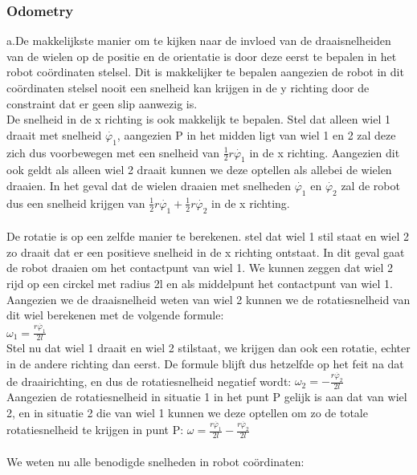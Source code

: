 \documentclass[a4paper]{article}
\begin{document}
\subsubsection{Odometry}
a.De makkelijkste manier om te kijken naar de invloed van de draaisnelheiden van de wielen op de positie en de orientatie is door deze eerst te bepalen in het robot co\"ordinaten stelsel. Dit is makkelijker te bepalen aangezien de robot in dit co\"ordinaten stelsel nooit een snelheid kan krijgen in de y richting door de constraint dat er geen slip aanwezig is.\\
De snelheid in de x richting is ook makkelijk te bepalen. Stel dat alleen wiel 1 draait met snelheid $\dot{\varphi_{1}}$, aangezien P in het midden ligt van wiel 1 en 2 zal deze zich dus voorbewegen met een snelheid van $\frac{1}{2}r\dot{\varphi_{1}}$ in de x richting. Aangezien dit ook geldt als alleen wiel 2 draait kunnen we deze optellen als allebei de wielen draaien.
In het geval dat de wielen draaien met snelheden $\dot{\varphi_{1}}$ en $\dot{\varphi_{2}}$ zal de robot dus een snelheid krijgen van $\frac{1}{2}r\dot{\varphi_{1}} + \frac{1}{2}r\dot{\varphi_{2}}$ in de x richting.\\\\
De rotatie is op een zelfde manier te berekenen. stel dat wiel 1 stil staat en wiel 2 zo draait dat er een positieve snelheid in de x richting ontstaat. In dit geval gaat de robot draaien om het contactpunt van wiel 1. We kunnen zeggen dat wiel 2 rijd op een circkel met radius 2l en als middelpunt het contactpunt van wiel 1. Aangezien we de draaisnelheid weten van wiel 2 kunnen we de rotatiesnelheid van dit wiel berekenen met de volgende formule:\\
$\omega_{1}=\frac{r\dot{\varphi_{1}}}{2l}$\\
Stel nu dat wiel 1 draait en wiel 2 stilstaat, we krijgen dan ook een rotatie, echter in de andere richting dan eerst.
De formule blijft dus hetzelfde op het feit na dat de draairichting, en dus de rotatiesnelheid negatief wordt:
$\omega_{2}=-\frac{r\dot{\varphi_{2}}}{2l}$\\
Aangezien de rotatiesnelheid in situatie 1 in het punt P gelijk is aan dat van wiel 2, en in situatie 2 die van wiel 1 kunnen we deze optellen om zo de totale rotatiesnelheid te krijgen in punt P: $\omega=\frac{r\dot{\varphi_{1}}}{2l}-\frac{r\dot{\varphi_{2}}}{2l}$\\\\
We weten nu alle benodigde snelheden in robot co\"ordinaten:\\\\
\end{document}

